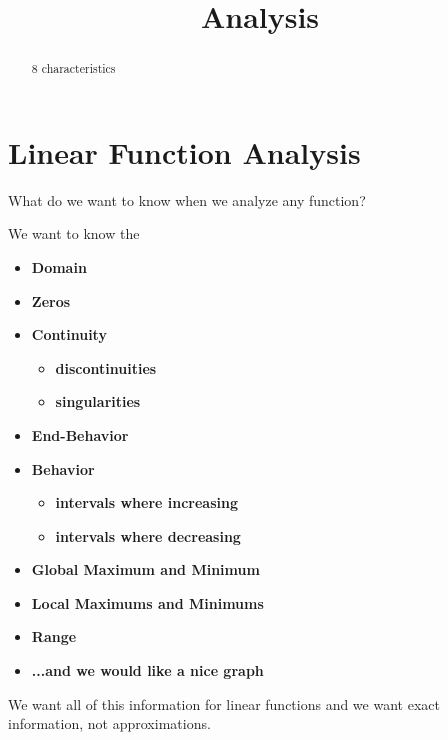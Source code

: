 \documentclass{ximera}
\title{Analysis}
\begin{document}
\begin{abstract}
8 characteristics
\end{abstract}
\maketitle





\section*{Linear Function Analysis}

What do we want to know when we analyze any function?

We want to know the 
\begin{itemize}
     \item \textbf{\textcolor{red!80!black}{Domain}} 
     \item \textbf{\textcolor{red!80!black}{Zeros}} 
     \item \textbf{\textcolor{red!80!black}{Continuity}} 
\begin{itemize}
     \item \textbf{\textcolor{purple!85!blue}{discontinuities}} 
     \item \textbf{\textcolor{purple!85!blue}{singularities}} 
\end{itemize}
     \item \textbf{\textcolor{red!80!black}{End-Behavior}} 
     \item \textbf{\textcolor{red!80!black}{Behavior}} 
\begin{itemize}
     \item \textbf{\textcolor{purple!85!blue}{intervals where increasing}} 
     \item \textbf{\textcolor{purple!85!blue}{intervals where decreasing}} 
\end{itemize}
     \item \textbf{\textcolor{red!80!black}{Global Maximum and Minimum}} 
     \item \textbf{\textcolor{red!80!black}{Local Maximums and Minimums}} 
     \item \textbf{\textcolor{red!80!black}{Range}} 
     \item \textbf{\textcolor{blue!55!black}{...and we would like a nice graph}} 
\end{itemize}

We want all of this information for linear functions and we want exact information, not approximations. \\
\end{document}
